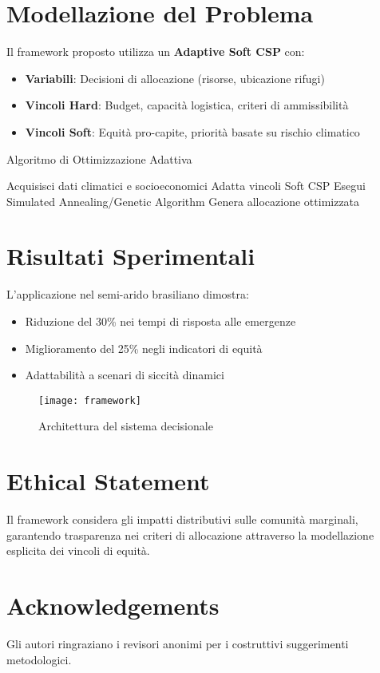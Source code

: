 \documentclass[letterpaper]{article}
\begin{document}
\section{Modellazione del Problema}
Il framework proposto utilizza un \textbf{Adaptive Soft CSP} con:
\begin{itemize}
    \item \textbf{Variabili}: Decisioni di allocazione (risorse, ubicazione rifugi)
    \item \textbf{Vincoli Hard}: Budget, capacità logistica, criteri di ammissibilità
    \item \textbf{Vincoli Soft}: Equità pro-capite, priorità basate su rischio climatico
\end{itemize}

\begin{algorithm}[t]
\caption{Algoritmo di Ottimizzazione Adattiva}
\begin{algorithmic}[1]
\STATE Acquisisci dati climatici e socioeconomici
\STATE Adatta vincoli Soft CSP
\STATE Esegui Simulated Annealing/Genetic Algorithm
\STATE Genera allocazione ottimizzata
\ENDWHILE
\end{algorithmic}
\end{algorithm}

\section{Risultati Sperimentali}
L'applicazione nel semi-arido brasiliano dimostra:
\begin{itemize}
    \item Riduzione del 30\% nei tempi di risposta alle emergenze
    \item Miglioramento del 25\% negli indicatori di equità
    \item Adattabilità a scenari di siccità dinamici
\end{itemize}

\begin{figure}[t]
\centering
\texttt{[image: framework]}
\caption{Architettura del sistema decisionale}
\label{fig:framework}
\end{figure}

\section*{Ethical Statement}
Il framework considera gli impatti distributivi sulle comunità marginali, garantendo trasparenza nei criteri di allocazione attraverso la modellazione esplicita dei vincoli di equità.

\section*{Acknowledgements}
Gli autori ringraziano i revisori anonimi per i costruttivi suggerimenti metodologici.


\end{document}
